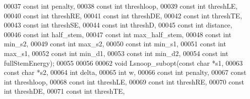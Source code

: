 \begin{DoxyCode}
00037                      \textcolor{keyword}{const} \textcolor{keywordtype}{int}  penalty,
00038                      \textcolor{keyword}{const} \textcolor{keywordtype}{int}  threshloop,
00039                      \textcolor{keyword}{const} \textcolor{keywordtype}{int}  threshLE,
00040                      \textcolor{keyword}{const} \textcolor{keywordtype}{int}  threshRE,
00041                      \textcolor{keyword}{const} \textcolor{keywordtype}{int}  threshDE,
00042                      \textcolor{keyword}{const} \textcolor{keywordtype}{int}  threshTE,
00043                      \textcolor{keyword}{const} \textcolor{keywordtype}{int}  threshSE,
00044                      \textcolor{keyword}{const} \textcolor{keywordtype}{int}  threshD,
00045                      \textcolor{keyword}{const} \textcolor{keywordtype}{int}  distance,
00046                      \textcolor{keyword}{const} \textcolor{keywordtype}{int}  half\_stem,
00047                      \textcolor{keyword}{const} \textcolor{keywordtype}{int}  max\_half\_stem,
00048                      \textcolor{keyword}{const} \textcolor{keywordtype}{int}  min\_s2,
00049                      \textcolor{keyword}{const} \textcolor{keywordtype}{int}  max\_s2,
00050                      \textcolor{keyword}{const} \textcolor{keywordtype}{int}  min\_s1,
00051                      \textcolor{keyword}{const} \textcolor{keywordtype}{int}  max\_s1,
00052                      \textcolor{keyword}{const} \textcolor{keywordtype}{int}  min\_d1,
00053                      \textcolor{keyword}{const} \textcolor{keywordtype}{int}  min\_d2,
00054                      \textcolor{keyword}{const} \textcolor{keywordtype}{int}  fullStemEnergy);
00055 
00056 
00062 \textcolor{keywordtype}{void} Lsnoop\_subopt(\textcolor{keyword}{const} \textcolor{keywordtype}{char} *s1,
00063                    \textcolor{keyword}{const} \textcolor{keywordtype}{char} *s2,
00064                    \textcolor{keywordtype}{int}        delta,
00065                    \textcolor{keywordtype}{int}        w,
00066                    \textcolor{keyword}{const} \textcolor{keywordtype}{int}  penalty,
00067                    \textcolor{keyword}{const} \textcolor{keywordtype}{int}  threshloop,
00068                    \textcolor{keyword}{const} \textcolor{keywordtype}{int}  threshLE,
00069                    \textcolor{keyword}{const} \textcolor{keywordtype}{int}  threshRE,
00070                    \textcolor{keyword}{const} \textcolor{keywordtype}{int}  threshDE,
00071                    \textcolor{keyword}{const} \textcolor{keywordtype}{int}  threshTE,

\end{DoxyCode}
